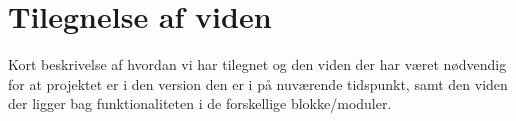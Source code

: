 \graphicspath{{Chapters/Alternative/}}


\section{Tilegnelse af viden}



Kort beskrivelse af hvordan vi har tilegnet og den viden der har været nødvendig for at projektet er i den version den er i på nuværende tidspunkt, samt den viden der ligger bag funktionaliteten i de forskellige blokke/moduler.
  
